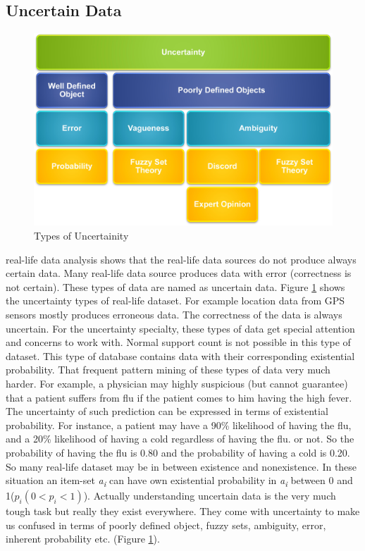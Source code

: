 \subsection{Uncertain Data}
\begin{figure}
\centering
  \includegraphics[width=.9\textwidth]{images/uncertainity_type.jpg}
\caption{Types of Uncertainity}
\label{figure:uncertainity_type}
\end{figure}
real-life data analysis shows that the real-life data sources do not produce always certain data. Many real-life data source produces data with error (correctness is not certain). These types of data are named as uncertain data. Figure \ref{figure:uncertainity_type} shows the uncertainty types of real-life dataset. For example location data from GPS sensors mostly produces erroneous data. The correctness of the data is always uncertain. For the uncertainty specialty, these types of data get special attention and concerns to work with. Normal support count is not possible in this type of dataset. This type of database contains data with their corresponding existential probability. That frequent pattern mining of these types of data very much harder. For example, a physician may highly suspicious (but cannot guarantee) that a patient suffers from flu if the patient comes to him having the high fever. The uncertainty of such prediction can be expressed in terms of existential probability. For instance, a patient may have a 90\% likelihood of having the flu, and a 20\% likelihood of having a cold regardless of having the flu. or not. So the probability of having the flu is 0.80 and the probability of having a cold is 0.20. So many real-life dataset may be in between existence and nonexistence. In these situation an item-set \emph{a\textsubscript{i}} can have own existential probability in \emph{a\textsubscript{i}} between 0 and 1($p_i(0<p_i<1)$). Actually understanding uncertain data is the very much tough task but really they exist everywhere. They come with uncertainty to make us confused in terms of poorly defined object, fuzzy sets, ambiguity, error, inherent probability etc. (Figure \ref{figure:uncertainity_type}).\\
